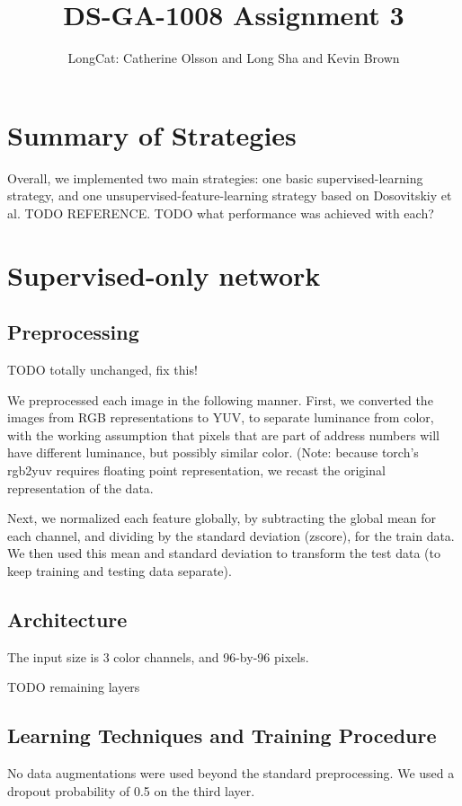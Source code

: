 \documentclass{article}
\title{DS-GA-1008 Assignment 3}
\author{LongCat: Catherine Olsson and Long Sha and Kevin Brown}
\begin{document}
 \maketitle

\section*{Summary of Strategies}

Overall, we implemented two main strategies: one basic supervised-learning strategy, and one unsupervised-feature-learning strategy based on Dosovitskiy et al. TODO REFERENCE. TODO what performance was achieved with each?

\section{Supervised-only network}

\subsection*{Preprocessing}

TODO totally unchanged, fix this!

We preprocessed each image in the following manner. First, we converted the
images from RGB representations to YUV, to separate luminance from color, with
the working assumption that pixels that are part of address numbers will have
different luminance, but possibly similar color. (Note: because torch's rgb2yuv
requires floating point representation, we recast the original representation of the data.

Next, we normalized each feature globally, by subtracting the global mean for
each channel, and dividing by the standard deviation (zscore), for the train
data. We then used this mean and standard deviation to transform the test data
(to keep training and testing data separate).

\subsection*{Architecture}

The input size is 3 color channels, and 96-by-96 pixels. 

TODO remaining layers

\subsection*{Learning Techniques and Training Procedure}
No data augmentations were used beyond the standard preprocessing. We used a dropout probability of 0.5 on the third layer.
\end{document}
